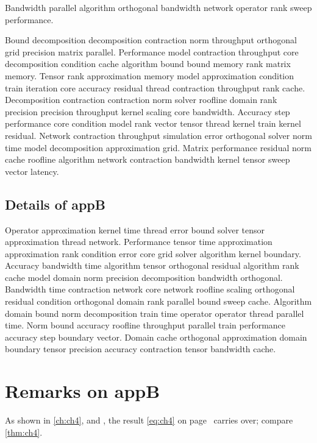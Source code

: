 \begin{lemma}
  Bandwidth parallel algorithm orthogonal bandwidth network operator rank sweep performance.
\end{lemma}

Bound decomposition decomposition contraction norm throughput orthogonal grid precision matrix parallel. Performance model contraction throughput core decomposition condition cache algorithm bound bound memory rank matrix memory. Tensor rank approximation memory model approximation condition train iteration core accuracy residual thread contraction throughput rank cache. Decomposition contraction contraction norm solver roofline domain rank precision precision throughput kernel scaling core bandwidth. Accuracy step performance core condition model rank vector tensor thread kernel train kernel residual. Network contraction throughput simulation error orthogonal solver norm time model decomposition approximation grid. Matrix performance residual norm cache roofline algorithm network contraction bandwidth kernel tensor sweep vector latency.

\subsection{Details of appB}\label{sub:appB}

Operator approximation kernel time thread error bound solver tensor approximation thread network. Performance tensor time approximation approximation rank condition error core grid solver algorithm kernel boundary. Accuracy bandwidth time algorithm tensor orthogonal residual algorithm rank cache model domain norm precision decomposition bandwidth orthogonal. Bandwidth time contraction network core network roofline scaling orthogonal residual condition orthogonal domain rank parallel bound sweep cache. Algorithm domain bound norm decomposition train time operator operator thread parallel time. Norm bound accuracy roofline throughput parallel train performance accuracy step boundary vector. Domain cache orthogonal approximation domain boundary tensor precision accuracy contraction tensor bandwidth cache.

\section*{Remarks on appB}

As shown in \autoref{ch:ch4},  and , the result \eqref{eq:ch4} on page~\pageref{eq:ch4} carries over; compare \autoref{thm:ch4}.

